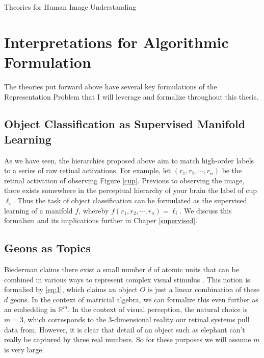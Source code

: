 \documentclass[12pt]{pom_thesis}
\begin{document}
\begin{chapter}{Theories for Human Image Understanding}
\section{Interpretations for Algorithmic Formulation}
\label{interp}
The theories put forward above have several key formulations of the Representation Problem that I will leverage and formalize throughout this thesis. 

\subsection*{Object Classification as Supervised Manifold Learning}
\label{manifold}

As we have seen, the hierarchies proposed above aim to match high-order labels to a series of raw retinal activations. For example, let $(r_1,r_2,\cdots, r_n)$ be the retinal activation of observing Figure \ref{cup}. Previous to observing the image, there exists somewhere in the perceptual hierarchy of your brain the label of cup $\ell_i$. Thus the task of object classification  can be formulated as the supervised learning of a manifold $f$, whereby $f(r_1,r_2,\cdots,r_n) = \ell_i$. We discuss this formalism and its implications further in Chaper \ref{supervised}.

\subsection*{Geons as Topics}
Biederman claims there exist a small number $d$ of atomic units that can be combined in various ways to represent complex visual stimulus \cite{biederman1987recognition}. This notion is formalied by \ref{eq:1}, which claims an object $O$ is just a linear combination of these $d$ geons. In the context of matricial algebra, we can formalize this even further as an embedding in $\mathbb{R}^m$. In the context of visual perception, the natural choice is $m=3$, which corresponds to the 3-dimensional reality our retinal systems pull data from. However, it is clear that detail of an object such as elephant can't really be captured by three real numbers. So for these purposes we will assume $m$ is very large. 


\end{chapter}
\end{document}
